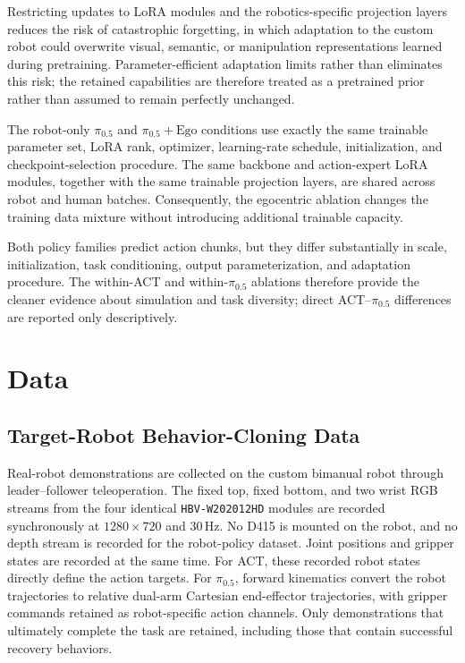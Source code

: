 \documentclass[10pt,conference]{IEEEtran}
\begin{document}
Restricting updates to LoRA modules and the robotics-specific projection layers
reduces the risk of catastrophic forgetting, in which adaptation to the custom
robot could overwrite visual, semantic, or manipulation representations learned
during pretraining. Parameter-efficient adaptation limits rather than
eliminates this risk; the retained capabilities are therefore treated as a
pretrained prior rather than assumed to remain perfectly unchanged.

The robot-only $\pi_{0.5}$ and
$\pi_{0.5}+\mathrm{Ego}$ conditions use exactly the same trainable parameter
set, LoRA rank, optimizer, learning-rate schedule, initialization, and
checkpoint-selection procedure. The same backbone and action-expert LoRA
modules, together with the same trainable projection layers, are shared across
robot and human batches. Consequently, the egocentric ablation changes the
training data mixture without introducing additional trainable capacity.

Both policy families predict action chunks, but they differ substantially in
scale, initialization, task conditioning, output parameterization, and
adaptation procedure. The within-ACT and within-$\pi_{0.5}$ ablations therefore
provide the cleaner evidence about simulation and task diversity; direct
ACT--$\pi_{0.5}$ differences are reported only descriptively.

\section{Data}
\label{sec:data}

\subsection{Target-Robot Behavior-Cloning Data}

Real-robot demonstrations are collected on the custom bimanual robot through leader--follower
teleoperation. The fixed top, fixed bottom, and two wrist RGB streams from the
four identical \texttt{HBV-W202012HD} modules are recorded synchronously at
\(1280\times720\) and \(30\,\mathrm{Hz}\). No D415 is mounted on the robot, and
no depth stream is recorded for the robot-policy dataset. Joint positions and
gripper states are recorded at the same time. For ACT, these recorded robot states
directly define the action targets. For $\pi_{0.5}$, forward kinematics convert
the robot trajectories to relative dual-arm Cartesian end-effector trajectories,
with gripper commands retained as robot-specific action channels. Only
demonstrations that ultimately complete the task are retained, including those
that contain successful recovery behaviors.
\end{document}
